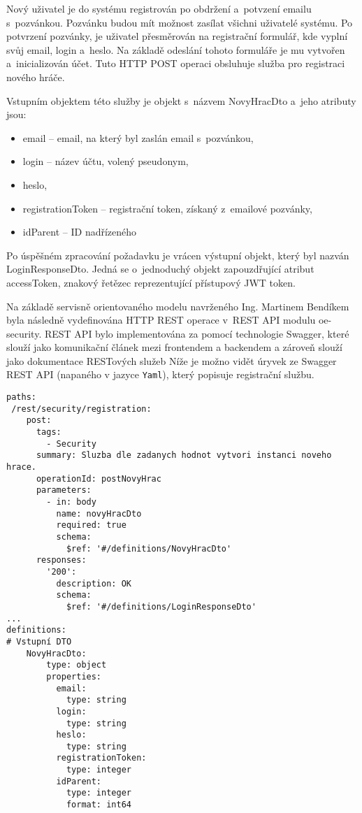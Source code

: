 \documentclass[12pt]{article}
\begin{document}
{Nový uživatel je do systému registrován po obdržení a~potvzení emailu s~pozvánkou.
Pozvánku budou mít možnost zasílat všichni uživatelé systému.
Po potvrzení pozvánky, je uživatel přesměrován na registrační
formulář, kde vyplní svůj email, login a~heslo. 
Na základě odeslání tohoto formuláře je mu vytvořen a~inicializován účet. 
Tuto HTTP POST operaci obsluhuje služba pro registraci nového hráče.

Vstupním objektem této služby je objekt s~názvem NovyHracDto a~jeho atributy jsou:
\begin{itemize}
\item email -- email, na který byl zaslán email s~pozvánkou,
\item login -- název účtu, volený pseudonym,
\item heslo,
\item registrationToken -- registrační token, získaný z~emailové pozvánky,
\item idParent -- ID nadřízeného
\end{itemize}

Po úspěšném zpracování požadavku je vrácen výstupní objekt, 
který byl nazván LoginResponseDto.
Jedná se o~jednoduchý objekt zapouzdřující atribut accessToken, znakový řetězec reprezentující přístupový JWT token. 

Na základě servisně orientovaného modelu navrženého Ing. Martinem Bendíkem byla
následně vydefinována HTTP REST operace v~REST API modulu oe-security. 
REST API bylo implementována za pomocí technologie Swagger,
které slouží jako komunikační článek mezi frontendem a backendem
a zároveň slouží jako dokumentace RESTových služeb
Níže je možno vidět úryvek ze Swagger REST API (napaného v jazyce \texttt{Yaml}),
který popisuje registrační službu.

\clearpage

\begin{lstlisting}
paths:
 /rest/security/registration:
    post:
      tags:
        - Security
      summary: Sluzba dle zadanych hodnot vytvori instanci noveho hrace.
      operationId: postNovyHrac
      parameters:
        - in: body
          name: novyHracDto
          required: true
          schema:
            $ref: '#/definitions/NovyHracDto'
      responses:
        '200':
          description: OK
          schema:
            $ref: '#/definitions/LoginResponseDto'
...
definitions:
# Vstupní DTO
    NovyHracDto:
        type: object
        properties:
          email:
            type: string
          login:
            type: string
          heslo:
            type: string
          registrationToken:
            type: integer
          idParent:
            type: integer
            format: int64
        

\end{lstlisting}}
\end{document}
